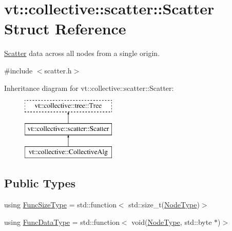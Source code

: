 \hypertarget{structvt_1_1collective_1_1scatter_1_1_scatter}{}\section{vt\+:\+:collective\+:\+:scatter\+:\+:Scatter Struct Reference}
\label{structvt_1_1collective_1_1scatter_1_1_scatter}


\hyperlink{structvt_1_1collective_1_1scatter_1_1_scatter}{Scatter} data across all nodes from a single origin.  




{\ttfamily \#include $<$scatter.\+h$>$}

Inheritance diagram for vt\+:\+:collective\+:\+:scatter\+:\+:Scatter\+:\begin{figure}[H]
\begin{center}
\leavevmode
\includegraphics[height=3.000000cm]{structvt_1_1collective_1_1scatter_1_1_scatter}
\end{center}
\end{figure}
\subsection*{Public Types}
\begin{DoxyCompactItemize}
\item 
using \hyperlink{structvt_1_1collective_1_1scatter_1_1_scatter_a977d895e42999a4078c6705ac851f447}{Func\+Size\+Type} = std\+::function$<$ std\+::size\+\_\+t(\hyperlink{namespacevt_a866da9d0efc19c0a1ce79e9e492f47e2}{Node\+Type})$>$
\item 
using \hyperlink{structvt_1_1collective_1_1scatter_1_1_scatter_a19da1fe0f7347a8e91f08b6a19fee781}{Func\+Data\+Type} = std\+::function$<$ void(\hyperlink{namespacevt_a866da9d0efc19c0a1ce79e9e492f47e2}{Node\+Type}, std\+::byte $\ast$)$>$
\end{DoxyCompactItemize}
